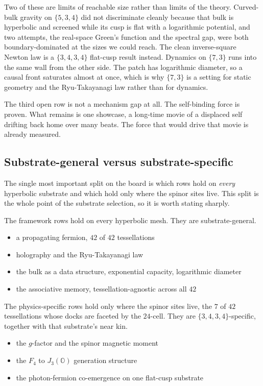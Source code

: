 Two of these are limits of reachable size rather than limits of the theory. Curved-bulk gravity on $\{5,3,4\}$ did not discriminate cleanly because that bulk is hyperbolic and screened while its cusp is flat with a logarithmic potential, and two attempts, the real-space Green's function and the spectral gap, were both boundary-dominated at the sizes we could reach. The clean inverse-square Newton law is a $\{3,4,3,4\}$ flat-cusp result instead. Dynamics on $\{7,3\}$ runs into the same wall from the other side. The patch has logarithmic diameter, so a causal front saturates almost at once, which is why $\{7,3\}$ is a setting for static geometry and the Ryu-Takayanagi law rather than for dynamics.

The third open row is not a mechanism gap at all. The self-binding force is proven. What remains is one showcase, a long-time movie of a displaced self drifting back home over many beats. The force that would drive that movie is already measured.

\subsection{Substrate-general versus substrate-specific}

The single most important split on the board is which rows hold on \emph{every} hyperbolic substrate and which hold only where the spinor sites live. This split is the whole point of the substrate selection, so it is worth stating sharply.

The framework rows hold on every hyperbolic mesh. They are substrate-general.

\begin{itemize}
\item a propagating fermion, $42$ of $42$ tessellations
\item holography and the Ryu-Takayanagi law
\item the bulk as a data structure, exponential capacity, logarithmic diameter
\item the associative memory, tessellation-agnostic across all $42$
\end{itemize}

The physics-specific rows hold only where the spinor sites live, the $7$ of $42$ tessellations whose docks are faceted by the $24$-cell. They are $\{3,4,3,4\}$-specific, together with that substrate's near kin.

\begin{itemize}
\item the $g$-factor and the spinor magnetic moment
\item the $F_4$ to $J_3(\mathbb{O})$ generation structure
\item the photon-fermion co-emergence on one flat-cusp substrate
\end{itemize}

